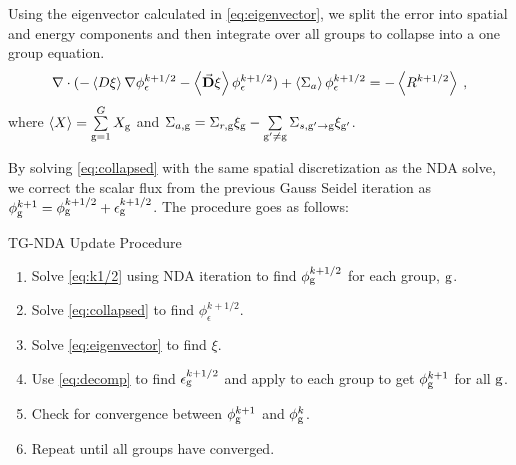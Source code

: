   Using the eigenvector calculated in \eqref{eq:eigenvector}, we split the error into spatial and energy components and then integrate over all groups to collapse into a one group equation.
  \begin{equation}
  \nabla\cdot(-\left< D \xi \right> \nabla \phi_{\epsilon}^{k+1/2} - \left<\vec{\bf D} \xi
  \right> \phi_{\epsilon}^{k+1/2}) + \left< \Sigma_{a} \right> \phi_{\epsilon}^{k+1/2} = - \left< R^{k+1/2} \right> \:,\label{eq:collapsed}
  \end{equation}
  where $\left< X \right> = \sum\limits_{\mathrm{g} = 1}^G X_{\mathrm{g}} $ and $\Sigma_{a,\mathrm{g}}  = \Sigma_{r,\mathrm{g}}\xi_{\mathrm{g}} - \sum\limits_{{\mathrm{g}'}\neq\mathrm{g}} \Sigma_{s,\mathrm{g}'\rightarrow \mathrm{g}} \xi_{\mathrm{g}'}$.
  \par
  By solving \eqref{eq:collapsed} with the same spatial discretization as the NDA solve, we correct the scalar flux from the previous Gauss Seidel iteration as $\phi_{\mathrm{g}}^{k+1} = \phi_{\mathrm{g}}^{k+1/2} + \epsilon_{\mathrm{g}}^{k+1/2}$. The procedure goes as follows:
  \vspace{5mm}

  TG-NDA Update Procedure
  \begin{enumerate}
      \item Solve \eqref{eq:k1/2} using NDA iteration to find $\phi_{\mathrm{g}}^{k+1/2}$ for each group, $\mathrm{g}$. 
      \item Solve \eqref{eq:collapsed} to find $\phi_\epsilon^{k+1/2}$. 
      \item Solve \eqref{eq:eigenvector} to find $\xi$. 
      \item Use \eqref{eq:decomp} to find $\epsilon_{\mathrm{g}}^{k+1/2}$ and apply to each group to get $\phi_{\mathrm{g}}^{k+1}$ for all $\mathrm{g}$. 
      \item Check for convergence between $\phi_{\mathrm{g}}^{k+1}$ and $\phi_{\mathrm{g}}^{k}$.
      \item Repeat until all groups have converged.
  \end{enumerate}